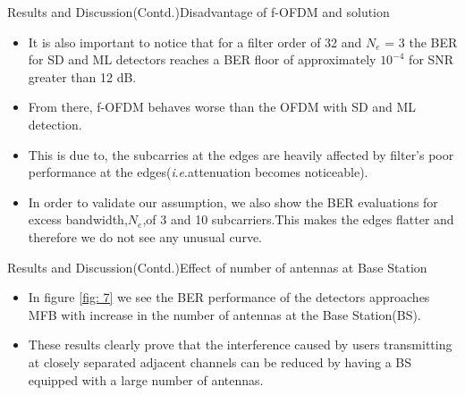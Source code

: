 \documentclass{beamer}
\newcommand{\ie}{\textit{i}.\textit{e}.}
\begin{document}
\begin{frame}{Results and Discussion(Contd.)}{Disadvantage of f-OFDM and solution}
    \begin{itemize}
        \item It is also important to notice that for a filter order of 32 and $N_e$ = 3 the BER for SD and ML detectors reaches a BER floor of approximately $10^{-4}$ for SNR greater than 12 dB. 
        \item From there, f-OFDM behaves worse than the OFDM with SD and ML detection.
        \item This is due to, the subcarries at the edges are heavily affected by filter's poor performance at the edges(\ie attenuation becomes noticeable).
        \item In order to validate our assumption, we also show the BER evaluations for excess bandwidth,$N_e$,of 3 and 10 subcarriers.This makes the edges flatter and therefore we do not see any unusual curve.
    \end{itemize}
\end{frame}
\begin{frame}{Results and Discussion(Contd.)}{Effect of number of antennas at Base Station}
    \begin{itemize}
        \item In figure \ref{fig: 7} we see the BER performance of the detectors approaches MFB with increase in the number of antennas at the Base Station(BS).
        \item These results clearly prove that the interference caused by users transmitting at closely separated adjacent channels can be reduced by having a BS equipped with a large number of antennas.
    \end{itemize}
\end{frame}
\end{document}
